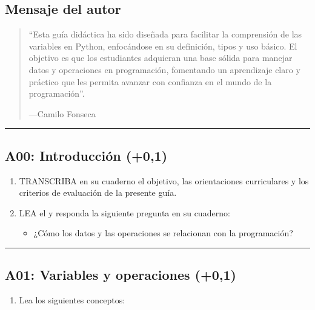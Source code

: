 \documentclass[letterpaper,10pt,spanish]{sphinxmanual}
\begin{document}
\subsection{Mensaje del autor}
\label{\detokenize{1_guias/10programacion/G1025:mensaje-del-autor}}\begin{quote}

\sphinxAtStartPar
“Esta guía didáctica ha sido diseñada para facilitar la comprensión de las variables en Python, enfocándose en su definición, tipos y uso básico. El objetivo es que los estudiantes adquieran una base sólida para manejar datos y operaciones en programación, fomentando un aprendizaje claro y práctico que les permita avanzar con confianza en el mundo de la programación”.

\begin{flushright}
---Camilo Fonseca
\end{flushright}
\end{quote}


\bigskip\hrule\bigskip



\subsection{A00: Introducción (+0,1)}
\label{\detokenize{1_guias/10programacion/G1025:a00-introduccion-0-1}}
\sphinxAtStartPar
{}
\begin{enumerate}
%
\item {} 
\sphinxAtStartPar
TRANSCRIBA en su cuaderno el objetivo, las orientaciones curriculares y los criterios de evaluación de la presente guía.

\item {} 
\sphinxAtStartPar
LEA el  y responda la siguiente pregunta en su cuaderno:
\begin{itemize}
\item {} 
\sphinxAtStartPar
¿Cómo los datos y las operaciones se relacionan con la programación?

\end{itemize}

\end{enumerate}


\bigskip\hrule\bigskip



\subsection{A01: Variables y operaciones (+0,1)}
\label{\detokenize{1_guias/10programacion/G1025:a01-variables-y-operaciones-0-1}}
\sphinxAtStartPar
{}
\begin{enumerate}
%
\item {} 
\sphinxAtStartPar
Lea los siguientes conceptos:

\end{enumerate}
\end{document}
